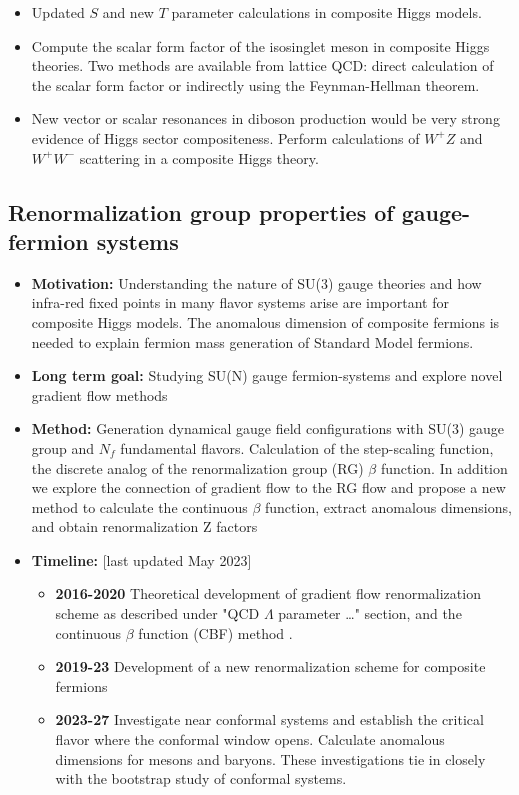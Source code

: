 \documentclass[12pt,hyperpdf]{article}
\begin{document}
\begin{itemize}
\begin{itemize}
\begin{itemize}
       \item Updated $S$ and new $T$ parameter calculations in composite Higgs models.
       \item Compute the scalar form factor of the isosinglet meson in composite Higgs theories. Two methods are available from lattice QCD: direct calculation of the scalar form factor or indirectly using the Feynman-Hellman theorem.
       \item New vector or scalar resonances in diboson production would be very strong evidence of Higgs sector compositeness. Perform calculations of $W^+ Z$ and $W^+ W^-$ scattering in a composite Higgs theory.
   \end{itemize}
\end{itemize}
\end{itemize}



\subsection{Renormalization group properties of gauge-fermion systems }
\begin{itemize}
    \item { \bf Motivation:}
     Understanding the nature of SU(3) gauge theories and how infra-red
     fixed points in many flavor systems arise are important for composite Higgs models. The anomalous dimension of composite fermions is needed to explain fermion mass generation of Standard Model fermions.  
    \item {\bf Long term goal:} Studying SU(N) gauge fermion-systems and explore novel gradient flow methods
    \item {\bf Method:}  Generation dynamical gauge field configurations with
     SU(3) gauge group and $N_f$ fundamental flavors. Calculation of
     the step-scaling function, the discrete analog of the
     renormalization group (RG) $\beta$ function. In addition we
     explore the connection of gradient flow to the RG flow and propose
     a new method to calculate the continuous $\beta$ function,
     extract anomalous dimensions, and obtain renormalization Z factors
\item{\bf Timeline:} \hfill [last updated May 2023]
\begin{itemize}
    \item{\bf 2016-2020} Theoretical development of gradient flow renormalization scheme as described under "QCD $\Lambda$ parameter \dots " section, and  the continuous $\beta$ function (CBF) method \cite{Fodor:2017die,Hasenfratz:2019hpg}.
    \item{\bf 2019-23} Development of a new renormalization scheme for composite fermions \cite{Hasenfratz:2022wll}
    \item{\bf 2023-27} Investigate near conformal systems and establish the critical flavor where the conformal window opens. Calculate anomalous dimensions for mesons and baryons. These investigations tie in closely with the bootstrap study of conformal systems. 
\end{itemize}
\end{itemize}
\end{document}
